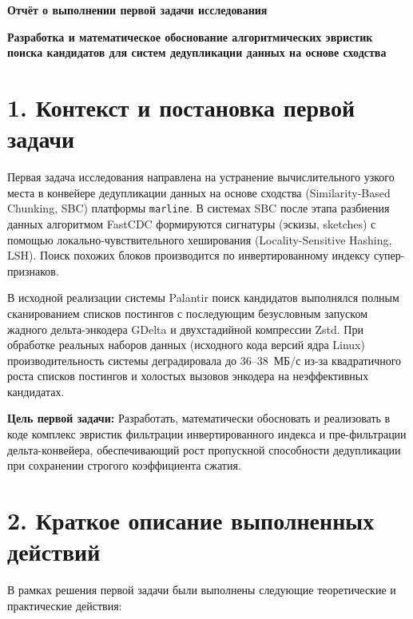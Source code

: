 \documentclass[a4paper,14pt]{extarticle}
\begin{document}
\begin{center}
    \textbf{\Large Отчёт о выполнении первой задачи исследования}
    
    \vspace{0.5em}
    \textbf{\large Разработка и математическое обоснование алгоритмических эвристик поиска кандидатов для систем дедупликации данных на основе сходства}
\end{center}

\vspace{1em}

\section*{1. Контекст и постановка первой задачи}

Первая задача исследования направлена на устранение вычислительного узкого места в конвейере дедупликации данных на основе сходства (Similarity-Based Chunking, SBC) платформы \texttt{marline}. В системах SBC после этапа разбиения данных алгоритмом FastCDC формируются сигнатуры (эскизы, sketches) с помощью локально-чувствительного хеширования (Locality-Sensitive Hashing, LSH). Поиск похожих блоков производится по инвертированному индексу супер-признаков.

В исходной реализации системы Palantir поиск кандидатов выполнялся полным сканированием списков постингов с последующим безусловным запуском жадного дельта-энкодера GDelta и двухстадийной компрессии Zstd. При обработке реальных наборов данных (исходного кода версий ядра Linux) производительность системы деградировала до 36--38~МБ/с из-за квадратичного роста списков постингов и холостых вызовов энкодера на неэффективных кандидатах.

\textbf{Цель первой задачи:} Разработать, математически обосновать и реализовать в коде комплекс эвристик фильтрации инвертированного индекса и пре-фильтрации дельта-конвейера, обеспечивающий рост пропускной способности дедупликации при сохранении строгого коэффициента сжатия.

\section*{2. Краткое описание выполненных действий}

В рамках решения первой задачи были выполнены следующие теоретические и практические действия:
\end{document}
